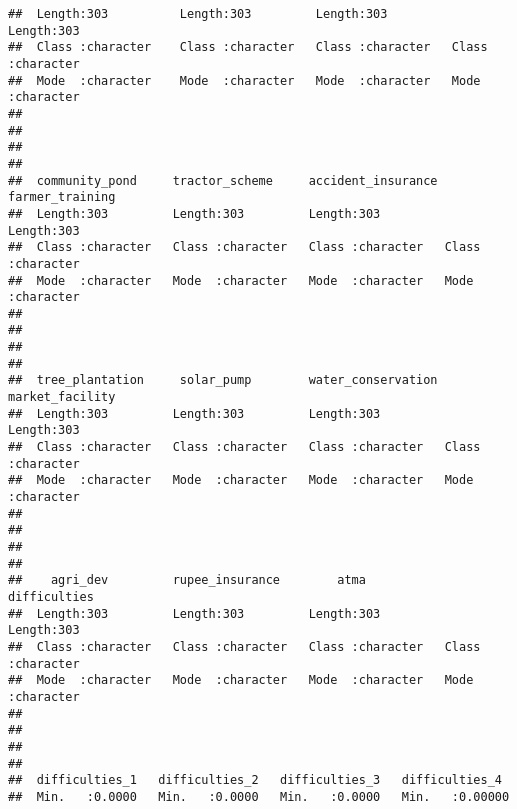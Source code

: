 \documentclass[
]{article}
\begin{document}
\begin{verbatim}
##  Length:303          Length:303         Length:303         Length:303        
##  Class :character    Class :character   Class :character   Class :character  
##  Mode  :character    Mode  :character   Mode  :character   Mode  :character  
##                                                                              
##                                                                              
##                                                                              
##                                                                              
##  community_pond     tractor_scheme     accident_insurance farmer_training   
##  Length:303         Length:303         Length:303         Length:303        
##  Class :character   Class :character   Class :character   Class :character  
##  Mode  :character   Mode  :character   Mode  :character   Mode  :character  
##                                                                             
##                                                                             
##                                                                             
##                                                                             
##  tree_plantation     solar_pump        water_conservation market_facility   
##  Length:303         Length:303         Length:303         Length:303        
##  Class :character   Class :character   Class :character   Class :character  
##  Mode  :character   Mode  :character   Mode  :character   Mode  :character  
##                                                                             
##                                                                             
##                                                                             
##                                                                             
##    agri_dev         rupee_insurance        atma           difficulties      
##  Length:303         Length:303         Length:303         Length:303        
##  Class :character   Class :character   Class :character   Class :character  
##  Mode  :character   Mode  :character   Mode  :character   Mode  :character  
##                                                                             
##                                                                             
##                                                                             
##                                                                             
##  difficulties_1   difficulties_2   difficulties_3   difficulties_4   
##  Min.   :0.0000   Min.   :0.0000   Min.   :0.0000   Min.   :0.00000  

\end{verbatim}
\end{document}
